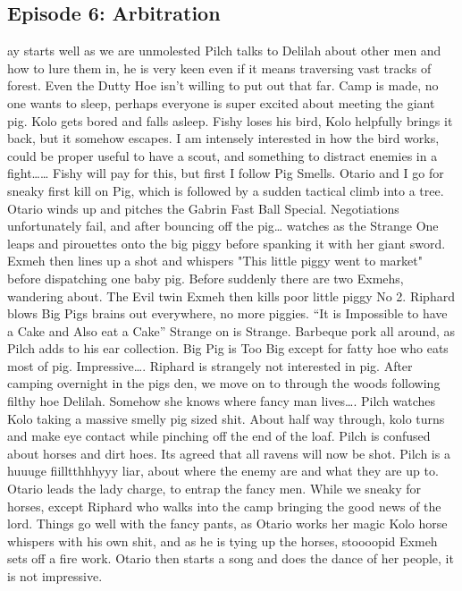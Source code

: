 \subsection{Episode 6: Arbitration}
ay starts well as we are unmolested\medskip
Pilch talks to Delilah about other men and how to lure them in, he is very keen even if it means traversing vast tracks of forest. Even the Dutty Hoe isn’t willing to put out that far.\medskip
Camp is made, no one wants to sleep, perhaps everyone is super excited about meeting the giant pig. Kolo gets bored and falls asleep.\medskip
Fishy loses his bird, Kolo helpfully brings it back, but it somehow escapes. I am intensely interested in how the bird works, could be proper useful to have a scout, and something to distract enemies in a fight……\medskip
Fishy will pay for this, but first I follow Pig Smells.\medskip
Otario and I go for sneaky first kill on Pig, which is followed by a sudden tactical climb into a tree. Otario winds up and pitches the Gabrin Fast Ball Special. Negotiations unfortunately fail, and after bouncing off the pig… watches as the Strange One leaps and pirouettes onto the big piggy before spanking it with her giant sword.\medskip
Exmeh then lines up a shot and whispers "This little piggy went to market" before dispatching one baby pig.\medskip
Before suddenly there are two Exmehs, wandering about. The Evil twin Exmeh then kills poor little piggy No 2.\medskip
Riphard blows Big Pigs brains out everywhere, no more piggies.\medskip
“It is Impossible to have a Cake and Also eat a Cake” Strange on is Strange.\medskip
Barbeque pork all around, as Pilch adds to his ear collection. Big Pig is Too Big except for fatty hoe who eats most of pig. Impressive…. Riphard is strangely not interested in pig.\medskip
After camping overnight in the pigs den, we move on to through the woods following filthy hoe Delilah. Somehow she knows where fancy man lives….\medskip
Pilch watches Kolo taking a massive smelly pig sized shit. About half way through, kolo turns and make eye contact while pinching off the end of the loaf.\medskip
Pilch is confused about horses and dirt hoes.\medskip
Its agreed that all ravens will now be shot.\medskip
Pilch is a huuuge fiilltthhhyyy liar, about where the enemy are and what they are up to.\medskip
Otario leads the lady charge, to entrap the fancy men. While we sneaky for horses, except Riphard who walks into the camp bringing the good news of the lord.\medskip
Things go well with the fancy pants, as Otario works her magic\medskip
Kolo horse whispers with his own shit, and as he is tying up the horses, stoooopid Exmeh sets off a fire work. Otario then starts a song and does the dance of her people, it is not impressive.\medskip
